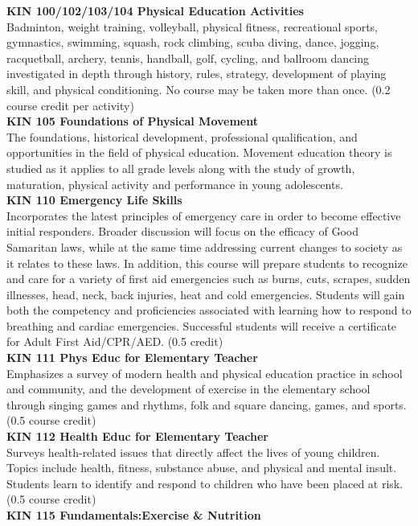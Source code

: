 \documentclass[
  letterpaper,
]{scrbook}
\begin{document}
\textbf{KIN 100/102/103/104 Physical Education Activities}\\
Badminton, weight training, volleyball, physical fitness, recreational
sports, gymnastics, swimming, squash, rock climbing, scuba diving,
dance, jogging, racquetball, archery, tennis, handball, golf, cycling,
and ballroom dancing investigated in depth through history, rules,
strategy, development of playing skill, and physical conditioning. No
course may be taken more than once. (0.2 course credit per activity)\\
\textbf{KIN 105 Foundations of Physical Movement}\\
The foundations, historical development, professional qualification, and
opportunities in the field of physical education. Movement education
theory is studied as it applies to all grade levels along with the study
of growth, maturation, physical activity and performance in young
adolescents.\\
\textbf{KIN 110 Emergency Life Skills}\\
Incorporates the latest principles of emergency care in order to become
effective initial responders. Broader discussion will focus on the
efficacy of Good Samaritan laws, while at the same time addressing
current changes to society as it relates to these laws. In addition,
this course will prepare students to recognize and care for a variety of
first aid emergencies such as burns, cuts, scrapes, sudden illnesses,
head, neck, back injuries, heat and cold emergencies. Students will gain
both the competency and proficiencies associated with learning how to
respond to breathing and cardiac emergencies. Successful students will
receive a certificate for Adult First Aid/CPR/AED. (0.5 credit)\\
\textbf{KIN 111 Phys Educ for Elementary Teacher}\\
Emphasizes a survey of modern health and physical education practice in
school and community, and the development of exercise in the elementary
school through singing games and rhythms, folk and square dancing,
games, and sports. (0.5 course credit)\\
\textbf{KIN 112 Health Educ for Elementary Teacher}\\
Surveys health-related issues that directly affect the lives of young
children. Topics include health, fitness, substance abuse, and physical
and mental insult. Students learn to identify and respond to children
who have been placed at risk. (0.5 course credit)\\
\textbf{KIN 115 Fundamentals:Exercise \& Nutrition}\\
\end{document}
